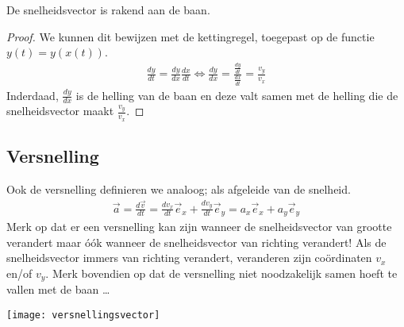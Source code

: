 \documentclass{ximera}
\begin{document}
	
	\begin{eigenschap}
	De snelheidsvector is rakend aan de baan.
	\end{eigenschap}
	\begin{proof}
	We kunnen dit bewijzen met de kettingregel, toegepast op de functie $y(t)=y(x(t))$.
	\begin{eqnarray*}
	 \frac{dy}{dt}=\frac{dy}{dx}\frac{dx}{dt}\Leftrightarrow\frac{dy}{dx}=\frac{\frac{dy}{dt}}{\frac{dx}{dt}}=\frac{v_y}{v_x}
	\end{eqnarray*}
	Inderdaad, $\frac{dy}{dx}$ is de helling van de baan en deze valt samen met de helling die de snelheidsvector maakt $\frac{v_y}{v_x}$.
	\end{proof}
	
	\subsection{Versnelling}
	
	Ook de versnelling definieren we analoog; als afgeleide van de snelheid.
	\begin{eqnarray*}
	\vec{a}=\frac{d\vec{v}}{dt}=\frac{dv_x}{dt}\vec{e}_x+\frac{dv_y}{dt}\vec{e}_y=a_x\vec{e}_x+a_y\vec{e}_y
	\end{eqnarray*}
	Merk op dat er een versnelling kan zijn wanneer de snelheidsvector van grootte verandert maar \'o\'ok wanneer de snelheidsvector van richting verandert! Als de snelheidsvector immers van richting verandert, veranderen zijn co\"ordinaten $v_x$ en/of $v_y$. Merk bovendien op dat de versnelling niet noodzakelijk samen hoeft te vallen met de baan \ldots
	\begin{image}
	
	\texttt{[image: versnellingsvector]}
	\end{image}
	
	
	
\end{document}
